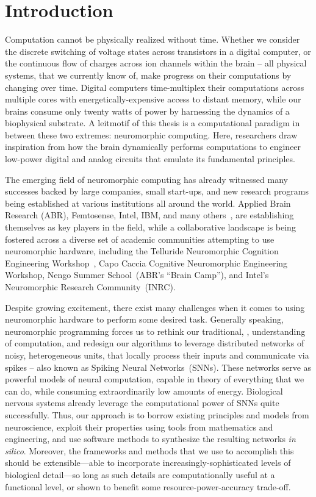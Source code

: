 
\chapter{Introduction}

Computation cannot be physically realized without time.
Whether we consider the discrete switching of voltage states across transistors in a
digital computer,
or the continuous flow of charges across ion channels within the brain -- 
all physical systems, that we currently know of, make progress on their computations
by changing over time.
Digital computers time-multiplex their computations across multiple cores with energetically-expensive access to distant memory, while our brains consume only twenty watts of power by harnessing the dynamics of a biophysical substrate.
A leitmotif of this thesis is a computational paradigm
in between these two extremes: neuromorphic computing.
Here, researchers draw inspiration from how the
brain dynamically performs computations
to engineer low-power digital and analog circuits that emulate its fundamental principles.

The emerging field of neuromorphic computing has already
witnessed many successes backed by large companies, small start-ups, and new research
programs being established at various institutions all around the world.
Applied Brain Research (ABR), Femtosense, Intel, IBM, and many others~\citep{marketreport2018}, are establishing themselves as key players in the field, while a collaborative landscape is being fostered across a diverse set of academic communities attempting to use neuromorphic hardware, including the Telluride Neuromorphic Cognition Engineering Workshop~\citep{cohen2001report}, Capo Caccia Cognitive Neuromorphic Engineering Workshop, Nengo Summer School~(ABR's ``Brain Camp''), and Intel's Neuromorphic Research Community~(INRC).

Despite growing excitement, there exist many challenges when it comes to using
neuromorphic hardware to perform some desired task.
Generally speaking, neuromorphic programming forces us to rethink our traditional,
\citet{von1958}, understanding of computation, and redesign our algorithms to leverage distributed networks of noisy, heterogeneous units, that locally process their inputs and communicate via spikes -- also known as Spiking Neural Networks~(SNNs).
These networks serve as powerful models of neural computation, capable in theory of everything that we can do, while consuming extraordinarily low amounts of energy.
Biological nervous systems already leverage the computational power of SNNs quite successfully.
Thus, our approach is to borrow existing
principles and models from neuroscience, exploit their properties using tools from mathematics and engineering,
and use software methods to synthesize the resulting networks \emph{in silico}.
Moreover, the frameworks and methods that we use to accomplish this should be extensible---able to incorporate increasingly-sophisticated levels of biological detail---so long as such details are computationally useful at a functional level, or shown to benefit some resource-power-accuracy trade-off.

